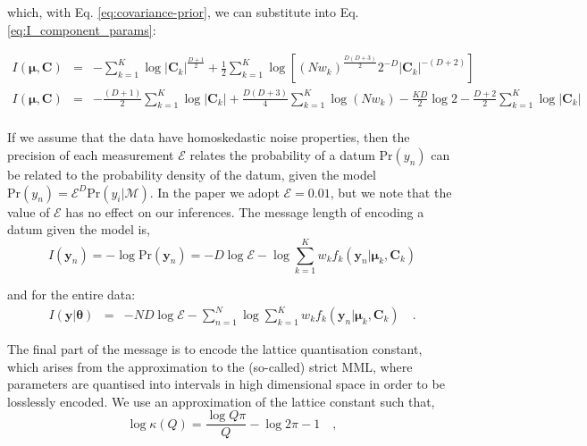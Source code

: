 \documentclass{article}
\newcommand{\vect}[1]{\boldsymbol{\mathbf{#1}}}
\def\veccov{\vect{C}}
\def\vecmean{\vect{\mu}}
\def\vectheta{\vect{\theta}}
\def\weight{w}
\def\datum{y}
\def\data{\vect{\datum}}
\begin{document}
\noindent{}which, with Eq. \ref{eq:covariance-prior}, we can substitute into Eq. \ref{eq:I_component_params}:

\begin{eqnarray}
I(\vecmean,\veccov) &=& -\sum_{k=1}^{K}\log{|\veccov_k|^{\frac{D + 1}{2}}}
 + \frac{1}{2}\sum_{k=1}^{K}\log{\left[(N\weight_k)^\frac{D(D+3)}{2}2^{-D}|\veccov_k|^{-(D+2)}\right]} \nonumber \\
I(\vecmean,\veccov) &=& -\frac{(D + 1)}{2}\sum_{k=1}^{K}\log{|\veccov_k|}
 + \frac{D(D+3)}{4}\sum_{k=1}^{K}\log{\left(N\weight_k\right)} -\frac{KD}{2}\log{2} -\frac{D+2}{2}\sum_{k=1}^{K}\log{|\veccov_k|} \nonumber \\
\end{eqnarray}

If we assume that the data have homoskedastic noise properties, then the 
precision of each measurement $\mathcal{E}$ relates the probability of a
datum $\textrm{Pr}(\datum_n)$ can be related to the probability density of
the datum, given the model 
$\textrm{Pr}(\datum_n) = \mathcal{E}^{D}\textrm{Pr}(y_i|\mathcal{M})$.
In the paper we adopt $\mathcal{E} = 0.01$, but we note that the value of
$\mathcal{E}$ has no effect on our inferences.  The message length of encoding
a datum given the model is,
\begin{equation}
  I(\data_n) = -\log{\textrm{Pr}(\data_n)} = -D\log\mathcal{E} - \log\sum_{k=1}^{K}\weight_{k}f_{k}(\data_n|\vecmean_k,\veccov_k)
\end{equation}

\noindent{}and for the entire data:
\begin{eqnarray}
  I(\data|\vectheta) &=& -ND\log\mathcal{E} - \sum_{n=1}^{N}\log\sum_{k=1}^{K}w_{k}f_k(\data_n|\vecmean_k,\veccov_k) \quad .
\end{eqnarray}

The final part of the message is to encode the lattice quantisation constant,
which arises from the approximation to the (so-called) strict MML, where
parameters are quantised into intervals in high dimensional space in order to
be losslessly encoded.  We use an approximation of the lattice constant
\citep[see Sections 5.1.12 and 3.3.4 of ][]{Wallace_2005} such that,
\begin{equation}
  \log\kappa(Q) = \frac{\log{Q\pi}}{Q} - \log{2\pi} - 1 \quad ,
\end{equation}
\end{document}
